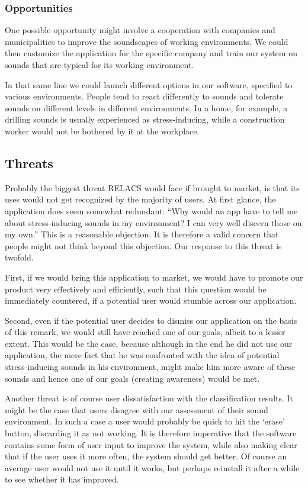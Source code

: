 \documentclass[a4paper]{article}
\begin{document}
\subsubsection{Opportunities}
One possible opportunity might involve a cooperation with companies and municipalities to improve the soundscapes of working environments.
We could then customize the application for the specific company and train our system on sounds that are typical for its working environment.

In that same line we could launch different options in our software, specified to various environments.
People tend to react differently to sounds and tolerate sounds on different levels in different environments.
In a home, for example, a drilling sounds is usually experienced as stress-inducing, while a construction worker would not be bothered by it at the workplace. 

\subsection{Threats}
Probably the biggest threat RELACS would face if brought to market, is that its uses would not get recognized by the majority of users.
At first glance, the application does seem somewhat redundant: ``Why would an app have to tell me about stress-inducing sounds in my environment? I can very well discern those on my own.''
This is a reasonable objection.
It is therefore a valid concern that people might not think beyond this objection.
Our response to this threat is twofold.

First, if we would bring this application to market, we would have to promote our product very effectively and efficiently,
such that this question would be immediately countered, if a potential user would stumble across our application. 

Second, even if the potential user decides to dismiss our application on the basis of this remark, we would still have reached one of our goals, albeit to a lesser extent.
This would be the case, because although in the end he did not use our application,
the mere fact that he was confronted with the idea of potential stress-inducing sounds in his environment, might make him more aware of these sounds and hence one of our goals (creating awareness) would be met.

Another threat is of course user dissatisfaction with the classification results.
It might be the case that users disagree with our assessment of their sound environment.
In such a case a user would probably be quick to hit the `erase' button, discarding it as not working.
It is therefore imperative that the software contains some form of user input to improve the system, while also making clear that if the user uses it more often, the system should get better.
Of course an average user would not use it until it works, but perhaps reinstall it after a while to see whether it has improved.
\end{document}
